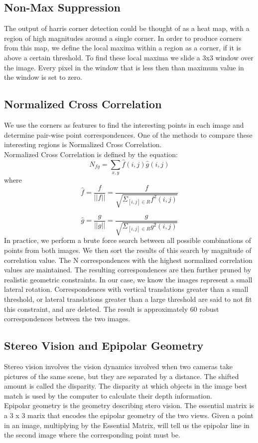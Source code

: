 \documentclass[letterpaper,11pt]{article}
\begin{document}
\subsection{Non-Max Suppression}
The output of harris corner detection could be thought of as a heat
map, with a region of high magnitudes around a single corner. In order
to produce corners from this map, we define the local maxima within a
region as a corner, if it is above a certain threshold. To find these
local maxima we slide a 3x3 window over the image. Every pixel in the
window that is less then than maximum value in the window is set to
zero.

\subsection{Normalized Cross Correlation}
We use the corners as features to find the interesting points in each
image and determine pair-wise point correspondences. One of the
methods to compare these interesting regions is Normalized Cross Correlation. \\

Normalized Cross Correlation is defined by the equation:
\[
N_{fg}  = \sum\limits_{x,y} \hat{f}(i,j)\hat{g}(i,j)
\]
where
\[
  \hat{f} = \frac{f}{||f||} = \frac{f}{\sqrt{\Sigma_{[i,j] \in R} f^{2}(i,j)}}
  \]

\[
  \hat{g} = \frac{g}{||g||} = \frac{g}{\sqrt{\Sigma_{[i,j] \in R} g^{2}(i,j)}}
  \]
  In practice, we perform a brute force search between all possible
  combinations of points from both images. We then sort the results of
  this search by magnitude of correlation value. The N correspondences
  with the highest normalized correlation values are maintained. The
  resulting correspondences are then further pruned by realistic
  geometric constraints. In our case, we know the images represent a
  small lateral rotation. Correspondences with vertical translations
  greater than a small threshold, or lateral translations greater than
  a large threshold are said to not fit this constraint, and are
  deleted. The result is approximately 60 robust correspondences
  between the two images.

  \subsection{Stereo Vision and Epipolar Geometry}
  Stereo vision involves the vision dynamics involved when two cameras take pictures of the same scene, but they are separated by a distance. The shifted amount is called the disparity. The disparity at which objects in the image best match is used by the computer to calculate their depth information.\\
  Epipolar geometry is the geometry describing stero vision. The essential matrix is a 3 x 3 marix that
  encodes the epipolar geometry of the two views. Given a point in an image, multiplying by the Essential Matrix, will tell us the epipolar line in the second image where the corresponding point must be.\\
  
\end{document}
